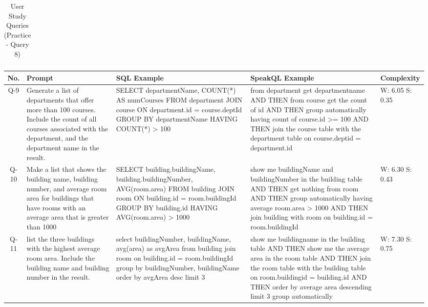 {\begin{table*}
\begin{tabular}{|c|p{3cm}|p{5.5cm}|p{5.5cm}|p{2cm}|}
        \hline
        \end{tabular}
        \caption{User Study Queries (Practice - Query 8)}
        \label{tab:queries1}
    \end{table*}

    \begin{table*}
        \begin{tabular}{|c|p{3cm}|p{5.5cm}|p{5.5cm}|p{2cm}|}
        \hline
        \textbf{No.} & \textbf{Prompt} & \textbf{SQL Example} & \textbf{SpeakQL Example} & \textbf{Complexity}\\
        \hline
        Q-9 & Generate a list of departments that offer more than 100 courses. Include the count of all courses associated with the department, and the department name in the result. & SELECT departmentName, COUNT(*) AS numCourses FROM department JOIN course ON department.id = course.deptId GROUP BY departmentName HAVING COUNT(*) > 100 & from department get departmentname AND THEN from course get the count of id AND THEN group automatically having count of course.id >= 100 AND THEN join the course table with the department table on course.deptid = department.id & W: 6.05 \newline S: 0.35\\
        \hline
        Q-10 & Make a list that shows the building name, building number, and average room area for buildings that have rooms with an average area that is greater than 1000 & SELECT building.buildingName, building.buildingNumber, AVG(room.area) FROM building JOIN room ON building.id = room.buildingId GROUP BY building.id HAVING AVG(room.area) > 1000 & show me buildingName and buildingNumber in the building table AND THEN get nothing from room AND THEN group automatically having average room.area > 1000 AND THEN join building with room on building.id = room.buildingId & W: 6.30 \newline S: 0.43\\
        \hline
        Q-11 & list the three buildings with the highest average room area. Include the building name and building number in the result. & select buildingNumber, buildingName, avg(area) as avgArea from building join room on building.id = room.buildingId group by buildingNumber, buildingName order by avgArea desc limit 3 & show me buildingname in the building table AND THEN show me the average area in the room table AND THEN join the room table with the building table on room.buildingid = building.id AND THEN order by average area descending limit 3 group automatically & W: 7.30 \newline S: 0.75\\

\end{tabular}
\end{table*}}
